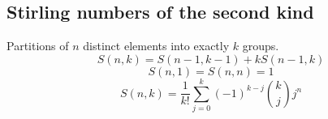   \subsection{Stirling numbers of the second kind}
  Partitions of $n$ distinct elements into exactly $k$ groups.
  $$S(n,k) = S(n-1,k-1) + k S(n-1,k)$$
  $$S(n,1) = S(n,n) = 1$$
  $$S(n,k) = \frac{1}{k!}\sum_{j=0}^k (-1)^{k-j}\binom{k}{j}j^n$$  

